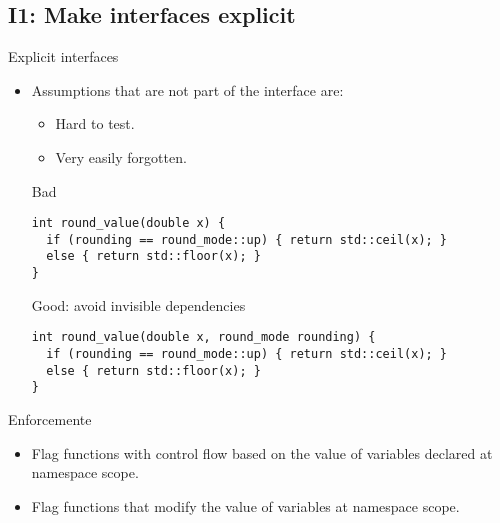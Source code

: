 \subsection{I1: Make interfaces explicit}

\begin{frame}[t,fragile]{Explicit interfaces}
\begin{itemize}
  \item Assumptions that are not part of the interface are:
    \begin{itemize}
      \item Hard to test.
      \item Very easily forgotten.
    \end{itemize}
\begin{block}{Bad}
\begin{lstlisting}
int round_value(double x) {
  if (rounding == round_mode::up) { return std::ceil(x); }
  else { return std::floor(x); }
}
\end{lstlisting}
\end{block}

\begin{block}{Good: avoid invisible dependencies}
\begin{lstlisting}
int round_value(double x, round_mode rounding) {
  if (rounding == round_mode::up) { return std::ceil(x); }
  else { return std::floor(x); }
}
\end{lstlisting}
\end{block}

\end{itemize}
\end{frame}

\begin{frame}[t,fragile]{Enforcemente}
\begin{itemize}
  \item Flag functions with control flow based on the value of variables
        declared at namespace scope.
  \item Flag functions that modify the value of variables at namespace scope.
\end{itemize}
\end{frame}
